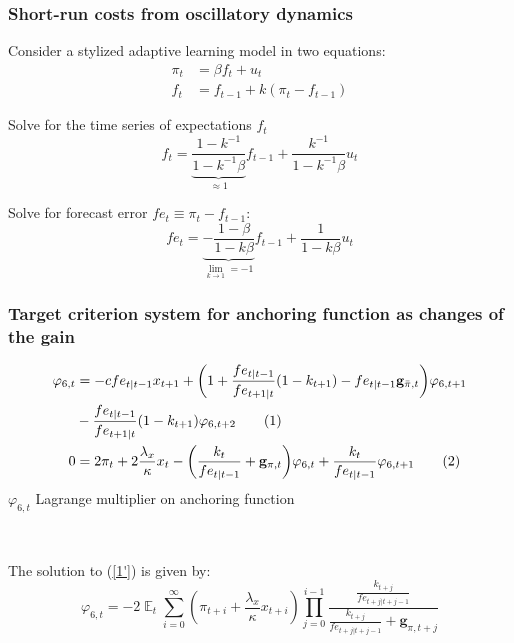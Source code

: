 \documentclass[11pt]{beamer}
\DeclareMathOperator{\E}{\mathbb{E}}
\newcommand\numberthis{\addtocounter{equation}{1}\tag{\theequation}} %
\begin{document}
\begin{frame}
	\frametitle{Short-run costs from oscillatory dynamics}
	\label{SRcosts}

 Consider a stylized adaptive learning model in two equations:
\begin{align}
\pi_t & = \beta f_t + u_t \label{simple_NKPC} \\
f_t & = f_{t-1} + k(\pi_t - f_{t-1}) \label{simple_expectations}
\end{align}

Solve for the time series of expectations $f_t$
\begin{equation}
f_t = \underbrace{\frac{1-k^{-1}}{1-k^{-1}\beta}}_{\approx 1}f_{t-1} + \frac{k^{-1}}{1-k^{-1}\beta}u_t
\end{equation}

Solve for forecast error $fe_t \equiv \pi_t - f_{t-1}$:
\begin{equation}
fe_t = \underbrace{-\frac{1-\beta}{1-k\beta}}_{\lim_{k \to 1} = -1}f_{t-1} + \frac{1}{1-k\beta}u_t \label{oscillating_fe}
\end{equation}

 
\hyperlink{SRLRtradeoffs}{}	


\end{frame}

\begin{frame}
	\frametitle{Target criterion system for anchoring function as changes of the gain}
	\label{generalTC}

\begin{align*}
\varphi_{6,t} & = -c fe_{t|t-1} x_{t+1} + \bigg(1+ \frac{fe_{t|t-1}}{fe_{t+1|t}}(1-k_{t+1}) -fe_{t|t-1} \mathbf{g}_{\bar{\pi},t} \bigg) \varphi_{6,t+1} \\
& -\frac{fe_{t|t-1}}{fe_{t+1|t}}(1-k_{t+1})\varphi_{6,t+2} \numberthis \label{6'} \\
0 & = 2\pi_t + 2\frac{\lambda_x}{\kappa}x_t   - \bigg( \frac{k_t}{fe_{t|t-1}} + \mathbf{g}_{\pi,t}\bigg)\varphi_{6,t} + \frac{k_t}{fe_{t|t-1}}\varphi_{6,t+1}\numberthis \label{1'}
\end{align*}
$\varphi_{6,t}$ Lagrange multiplier on anchoring function

\

The solution to (\ref{1'}) is given by:
\begin{equation}
\varphi_{6,t} = -2\E_t\sum_{i=0}^{\infty}(\pi_{t+i}+\frac{\lambda_x}{\kappa}x_{t+i})\prod_{j=0}^{i-1}\frac{\frac{k_{t+j}}{fe_{t+j|t+j-1}}}{\frac{k_{t+j}}{fe_{t+j|t+j-1}} + \mathbf{g}_{\pi, t+j}} \label{sol1'}
\end{equation}

 
\hyperlink{anchTC}{}	


\end{frame}
\end{document}
